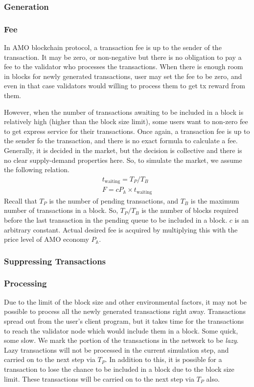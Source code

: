 \documentclass[a4paper,11pt]{scrartcl}
\newcommand{\amom}{\mathbb{A}}
\begin{document}
\subsubsection{Generation}
\subsubsection{Fee}
In AMO blockchain protocol, a transaction fee is up to the sender of the
transaction. It may be zero, or non-negative but there is no obligation to pay
a fee to the validator who processes the transactions. When there is enough
room in blocks for newly generated transactions, user may set the fee to be
zero, and even in that case validators would willing to process them to get tx
reward from them.

However, when the number of transactions awaiting to be included in a block is
relatively high (higher than the block size limit), some users want to non-zero
fee to get express service for their transactions. Once again, a transaction
fee is up to the sender fo the transaction, and there is no exact formula to
calculate a fee. Generally, it is decided in the market, but the decision is
collective and there is no clear supply-demand properties here. So, to simulate
the market, we assume the following relation.
\begin{eqnarray}
	t_\text{waiting} = T_P / T_B \\
	F = c P_\amom \times t_\text{waiting}
\end{eqnarray}
Recall that $T_P$ is the number of pending transactions, and $T_B$ is the
maximum number of transactions in a block. So, $T_P / T_B$ is the number of
blocks required before the last transaction in the pending queue to be included
in a block. $c$ is an arbitrary constant. Actual desired fee is acquired by
multiplying this with the price level of AMO economy $P_\amom$.

\subsubsection{Suppressing Transactions}

\subsubsection{Processing}
Due to the limit of the block size and other environmental factors, it may not
be possible to process all the newly generated transactions right away.
Transactions spread out from the user's client program, but it takes time for
the transactions to reach the validator node which would include them in a
block. Some quick, some slow. We mark the portion of the transactions in the
network to be \emph{lazy}. Lazy transactions will not be processed in the
current simulation step, and carried on to the next step via $T_P$. In addition
to this, it is possible for a transaction to lose the chance to be included in
a block due to the block size limit. These transactions will be carried on to
the next step via $T_P$ also.
\end{document}
